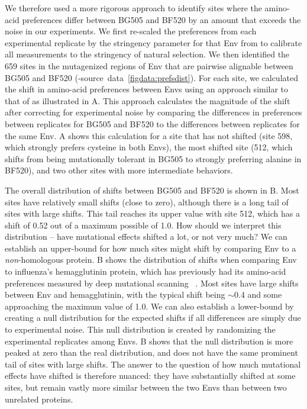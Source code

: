 \documentclass[9pt]{elife}
\begin{document}
We therefore used a more rigorous approach to identify sites where the amino-acid preferences differ between BG505 and BF520 by an amount that exceeds the noise in our experiments.
We first re-scaled the preferences from each experimental replicate by the stringency parameter for that Env from  to calibrate all measurements to the stringency of natural selection.
We then identified the 659 sites in the mutagenized regions of Env that are pairwise alignable between BG505 and BF520 (-source~data~\ref{figdata:prefsdist}).
For each site, we calculated the shift in amino-acid preferences between Envs using an approach similar to that of \citet{doud2015site} as illustrated in A.
This approach calculates the magnitude of the shift after correcting for experimental noise by comparing the differences in preferences between replicates for BG505 and BF520 to the differences between replicates for the same Env.
A shows this calculation for a site that has not shifted (site 598, which strongly prefers cysteine in both Envs), the most shifted site (512, which shifts from being mutationally tolerant in BG505 to strongly preferring alanine in BF520), and two other sites with more intermediate behaviors.

The overall distribution of shifts between BG505 and BF520 is shown in B.
Most sites have relatively small shifts (close to zero), although there is a long tail of sites with large shifts.
This tail reaches its upper value with site 512, which has a shift of 0.52 out of a maximum possible of 1.0.
How should we interpret this distribution -- have mutational effects shifted a lot, or not very much?
We can establish an upper-bound for how much sites might shift by comparing Env to a \emph{non}-homologous protein.
B shows the distribution of shifts when comparing Env to influenza's hemagglutinin protein, which has previously had its amino-acid preferences measured by deep mutational scanning~\citep{doud2016accurate} .
Most sites have large shifts between Env and hemagglutinin, with the typical shift being $\sim$0.4 and some approaching the maximum value of 1.0.
We can also establish a lower-bound by creating a null distribution for the expected shifts if all differences are simply due to experimental noise.
This null distribution is created by randomizing the experimental replicates among Envs.
B shows that the null distribution is more peaked at zero than the real distribution, and does not have the same prominent tail of sites with large shifts.
The answer to the question of how much mutational effects have shifted is therefore nuanced: they have substantially shifted at some sites, but remain vastly more similar between the two Envs than between two unrelated proteins. 
\end{document}
